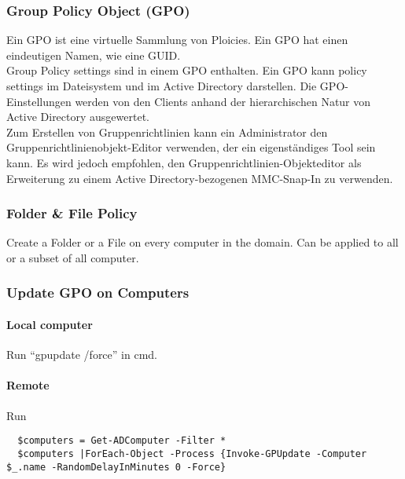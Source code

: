 \subsubsection{Group Policy Object (GPO)}
Ein GPO ist eine virtuelle Sammlung von Ploicies. 
Ein GPO hat einen eindeutigen Namen, wie eine GUID.\\

Group Policy settings sind in einem GPO enthalten. 
Ein GPO kann policy settings im Dateisystem und im Active Directory darstellen. 
Die GPO-Einstellungen werden von den Clients anhand der hierarchischen Natur von Active Directory ausgewertet.\\

Zum Erstellen von Gruppenrichtlinien kann ein Administrator den Gruppenrichtlinienobjekt-Editor verwenden, der ein eigenständiges Tool sein kann. 
Es wird jedoch empfohlen, den Gruppenrichtlinien-Objekteditor als Erweiterung zu einem Active Directory-bezogenen MMC-Snap-In zu verwenden.

\subsubsection{Folder \& File Policy}
Create a Folder or a File on every computer in the domain.
Can be applied to all or a subset of all computer.

\subsubsection{Update GPO on Computers}
\paragraph{Local computer}
Run ``gpupdate /force'' in cmd.

\paragraph{Remote}
Run 
\begin{lstlisting}
  $computers = Get-ADComputer -Filter *
  $computers |ForEach-Object -Process {Invoke-GPUpdate -Computer $_.name -RandomDelayInMinutes 0 -Force}
\end{lstlisting}
